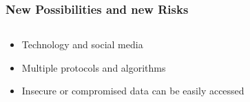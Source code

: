 \documentclass[12pt]{beamer}
\begin{document}
\begin{frame}
\frametitle{New Possibilities and new Risks}
\begin{columns}
\begin{column}{0.5\textwidth}
\begin{itemize}
\item<2-> Technology and social media 
\item<3-> Multiple protocols and algorithms 
\item<3-> Insecure or compromised data can be easily accessed
\end{itemize}
\end{column}
\begin{column}{0.5\textwidth}
 \break
{}
\end{column}
\end{columns}
\end{frame}
\end{document}
